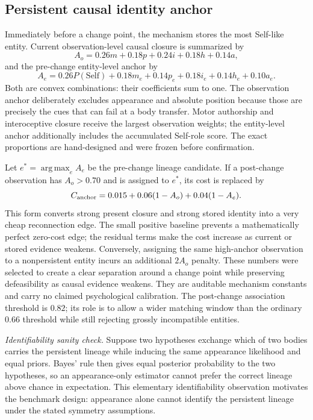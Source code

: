 \documentclass[journal]{IEEEtran}
\newcommand{\Self}{\mathrm{Self}}
\newcommand{\argmax}{\operatorname*{arg\,max}}
\begin{document}
\subsection{Persistent causal identity anchor}
Immediately before a change point, the mechanism stores the most Self-like entity. Current observation-level causal closure is summarized by
\begin{equation}
A_o=0.26m+0.18p+0.24i+0.18h+0.14a,
\label{eq:ao}
\end{equation}
and the pre-change entity-level anchor by
\begin{equation}
A_e=0.26P(\Self)+0.18m_e+0.14p_e+0.18i_e+0.14h_e+0.10a_e.
\label{eq:ae}
\end{equation}
Both are convex combinations: their coefficients sum to one. The observation anchor deliberately excludes appearance and absolute position because those are precisely the cues that can fail at a body transfer. Motor authorship and interoceptive closure receive the largest observation weights; the entity-level anchor additionally includes the accumulated Self-role score. The exact proportions are hand-designed and were frozen before confirmation.

Let $e^*=\argmax_e A_e$ be the pre-change lineage candidate. If a post-change observation has $A_o>0.70$ and is assigned to $e^*$, its cost is replaced by
\begin{equation}
C_{\rm anchor}=0.015+0.06(1-A_o)+0.04(1-A_e).
\label{eq:anchorcost}
\end{equation}
This form converts strong present closure and strong stored identity into a very cheap reconnection edge. The small positive baseline prevents a mathematically perfect zero-cost edge; the residual terms make the cost increase as current or stored evidence weakens. Conversely, assigning the same high-anchor observation to a nonpersistent entity incurs an additional $2A_o$ penalty. These numbers were selected to create a clear separation around a change point while preserving defeasibility as causal evidence weakens. They are auditable mechanism constants and carry no claimed psychological calibration. The post-change association threshold is $0.82$; its role is to allow a wider matching window than the ordinary $0.66$ threshold while still rejecting grossly incompatible entities.

\noindent\emph{Identifiability sanity check.}
Suppose two hypotheses exchange which of two bodies carries the persistent lineage while inducing the same appearance likelihood and equal priors. Bayes' rule then gives equal posterior probability to the two hypotheses, so an appearance-only estimator cannot prefer the correct lineage above chance in expectation. This elementary identifiability observation motivates the benchmark design: appearance alone cannot identify the persistent lineage under the stated symmetry assumptions.
\end{document}
